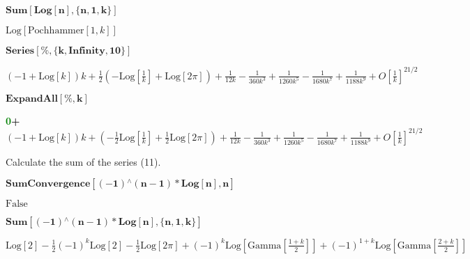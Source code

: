 \documentclass[12pt]{article}
\begin{document}
\begin{doublespace}
\noindent\(\pmb{\text{Sum}[\text{Log}[n],\{n,1,k\}]}\)
\end{doublespace}

\begin{doublespace}
\noindent\(\text{Log}[\text{Pochhammer}[1,k]]\)
\end{doublespace}

\begin{doublespace}
\noindent\(\pmb{\text{Series}[\%,\{k,\text{Infinity},10\}]}\)
\end{doublespace}

\begin{doublespace}
\noindent\((-1+\text{Log}[k]) k+\frac{1}{2} (-\text{Log}[\frac{1}{k}]+\text{Log}[2 \pi ])+\frac{1}{12 k}-\frac{1}{360 k^3}+\frac{1}{1260
k^5}-\frac{1}{1680 k^7}+\frac{1}{1188 k^9}+O[\frac{1}{k}]^{21/2}\)
\end{doublespace}

\begin{doublespace}
\noindent\(\pmb{\text{ExpandAll}[\%,k]}\)
\end{doublespace}

\begin{doublespace}
\bf{\textcolor{Green}{0}}+\noindent\((-1+\text{Log}[k]) k+(-\frac{1}{2} \text{Log}[\frac{1}{k}]+\frac{1}{2} \text{Log}[2 \pi ])+\frac{1}{12 k}-\frac{1}{360
k^3}+\frac{1}{1260 k^5}-\frac{1}{1680 k^7}+\frac{1}{1188 k^9}+O[\frac{1}{k}]^{21/2}\) \\
\end{doublespace}

Calculate the sum of the series (11).

\begin{doublespace}
\noindent\(\pmb{\text{SumConvergence}[(-1){}^{\wedge}(n-1)*\text{Log}[n],n]}\)
\end{doublespace}

\begin{doublespace}
\noindent\(\text{False}\)
\end{doublespace}

\begin{doublespace}
\noindent\(\pmb{\text{Sum}[(-1){}^{\wedge}(n-1)*\text{Log}[n],\{n,1,k\}]}\)
\end{doublespace}

\begin{doublespace}
\noindent\(\text{Log}[2]-\frac{1}{2} (-1)^k \text{Log}[2]-\frac{1}{2} \text{Log}[2 \pi ]+(-1)^k \text{Log}[\text{Gamma}[\frac{1+k}{2}]]+(-1)^{1+k}
\text{Log}[\text{Gamma}[\frac{2+k}{2}]]\)
\end{doublespace}
\end{document}
